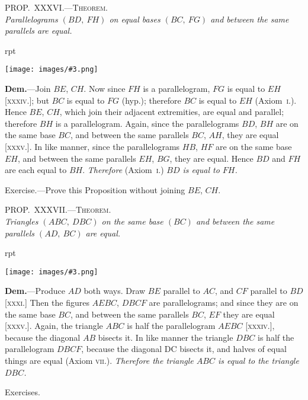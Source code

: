 \documentclass[oneside]{book}
\newcounter{wrapwidth}
\newcommand\myprop[2]{
\bigskip\Needspace*{4\baselineskip}\begin{center}\textsc{#1}\\\medskip\emph{#2}\par\end{center}
}
\newcommand\exhead[1]{
\Needspace*{5\baselineskip}\begin{center}
\textsf{#1}
\end{center}
}
\newcommand\imgflow[3]{
\setcounter{wrapwidth}{#1}
\begin{wrapfigure}[#2]{r}{\value{wrapwidth}pt}
\begin{center}
\vspace{-0.3in}
\texttt{[image: images/\#3.png]}
\end{center}
\end{wrapfigure}
}
\begin{document}
\myprop{PROP\@.~XXXVI\@.---Theorem.}{Parallelograms $(BD,\ FH)$ on equal bases $(BC,\ FG)$ and
between the same parallels are equal.}

\imgflow{190}{8}{f057}

\textbf{Dem.}---Join $BE$, $CH$. Now since $FH$ is a parallelogram,
$FG$ is equal
to $EH$ [\textsc{xxxiv}.]; but
$BC$ is equal to $FG$
(hyp.); therefore
$BC$ is equal to $EH$
(Axiom~\textsc{i}.). Hence
$BE$, $CH$, which join
their adjacent extremities,
are equal and parallel; therefore $BH$ is a
parallelogram. Again, since the parallelograms $BD$,
$BH$ are on the same base $BC$, and between the same
parallels $BC$, $AH$, they are equal [\textsc{xxxv}.]. In like
manner, since the parallelograms $HB$, $HF$ are on the
same base $EH$, and between the same parallels $EH$,
$BG$, they are equal. Hence $BD$ and $FH$ are each equal
to $BH$. \emph{Therefore} (Axiom~\textsc{i}.) \emph{$BD$ is equal to $FH$.}

\begin{footnotesize}
\textsf{Exercise}.---Prove this Proposition without joining $BE$, $CH$.
\par\end{footnotesize}


\myprop{PROP\@.~XXXVII\@.---Theorem.}{Triangles $(ABC,\ DBC)$ on the same base $(BC)$ and between
the same parallels $(AD,\ BC)$ are equal.}

\imgflow{190}{8}{f058}

\textbf{Dem.}---Produce $AD$ both ways. Draw $BE$ parallel
to $AC$, and $CF$ parallel
to $BD$ [\textsc{xxxi}.]
Then the figures
$AEBC$, $DBCF$ are
parallelograms; and
since they are on
the same base $BC$,
and between the
same parallels $BC$, $EF$ they are equal [\textsc{xxxv}.]. Again,
the triangle $ABC$ is half the parallelogram $AEBC$
[\textsc{xxxiv}.], because the diagonal $AB$ bisects it. In like
manner the triangle $DBC$ is half the parallelogram
$DBCF$, because the diagonal DC bisects it, and halves
of equal things are equal (Axiom \textsc{vii}.). \emph{Therefore the
triangle $ABC$ is equal to the triangle $DBC$.}

\exhead{Exercises.}
\end{document}
